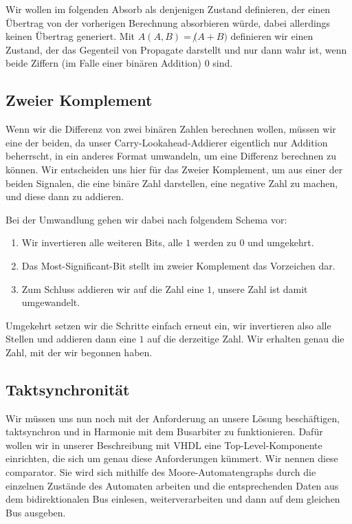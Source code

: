 \documentclass{report}
\begin{document}
Wir wollen im folgenden Absorb als denjenigen Zustand definieren, der einen Übertrag von der vorherigen Berechnung absorbieren würde, dabei allerdings keinen Übertrag generiert. Mit $A(A,B) = \not(A + B)$ definieren wir einen Zustand, der das Gegenteil von Propagate darstellt und nur dann wahr ist, wenn beide Ziffern (im Falle einer binären Addition) $0$ sind.

\subsection{Zweier Komplement}
\label{sec:zweier-komplement}

Wenn wir die Differenz von zwei binären Zahlen berechnen wollen, müssen wir eine der beiden, da unser Carry-Lookahead-Addierer eigentlich nur Addition beherrscht, in ein anderes Format umwandeln, um eine Differenz berechnen zu können. Wir entscheiden uns hier für das Zweier Komplement, um aus einer der beiden Signalen, die eine binäre Zahl darstellen, eine negative Zahl zu machen, und diese dann zu addieren.

Bei der Umwandlung gehen wir dabei nach folgendem Schema vor:

\begin{enumerate}
  \item Wir invertieren alle weiteren Bits, alle $1$ werden zu $0$ und umgekehrt.
  \item Das Most-Significant-Bit stellt im zweier Komplement das Vorzeichen dar.
  \item Zum Schluss addieren wir auf die Zahl eine $1$, unsere Zahl ist damit umgewandelt.
\end{enumerate}

Umgekehrt setzen wir die Schritte einfach erneut ein, wir invertieren also alle Stellen und addieren dann eine $1$ auf die derzeitige Zahl. Wir erhalten genau die Zahl, mit der wir begonnen haben.

\subsection{Taktsynchronität}
\label{sec:taktsynchronitat}

Wir müssen uns nun noch mit der Anforderung an unsere Lösung beschäftigen, taktsynchron und in Harmonie mit dem Busarbiter zu funktionieren. Dafür wollen wir in unserer Beschreibung mit VHDL eine Top-Level-Komponente einrichten, die sich um genau diese Anforderungen kümmert. Wir nennen diese comparator. Sie wird sich mithilfe des Moore-Automatengraphs durch die einzelnen Zustände des Automaten arbeiten und die entsprechenden Daten aus dem bidirektionalen Bus einlesen, weiterverarbeiten und dann auf dem gleichen Bus ausgeben. 
\newpage
\end{document}
